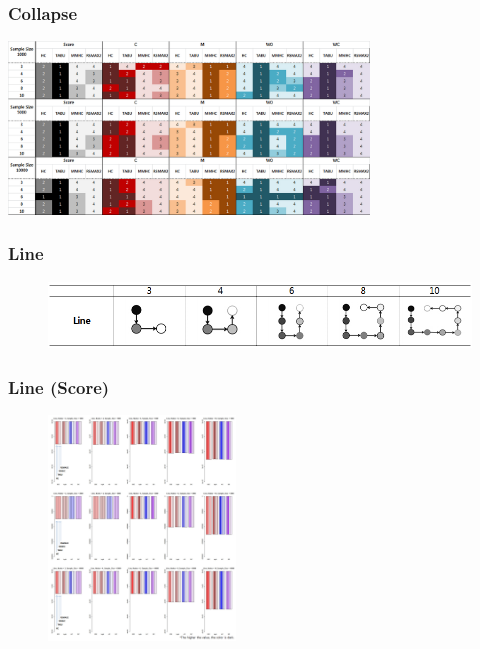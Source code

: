 \documentclass{beamer}
\begin{document}
\begin{frame}
\frametitle{Collapse}
{\scriptsize{}
	\begin{center}
		\includegraphics[height=130pt]{images/Result_Collapse}
	\end{center}
}
\end{frame}



\begin{frame}
\frametitle{Line}
{\scriptsize{}
	\begin{figure}
		\includegraphics[height=50pt]{images/Topologies_Line}
	\end{figure}	
}
\end{frame}



\begin{frame}
\frametitle{Line (Score)}
{\scriptsize{}
	\begin{figure}
		\includegraphics[height=170pt]{images/02_Line_Score}
	\end{figure}	
}
\end{frame}
\end{document}
